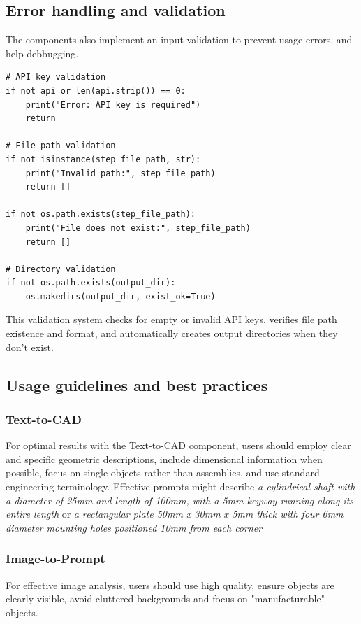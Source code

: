 \subsection{Error handling and validation}

The components also implement an input validation to prevent usage errors, and help debbugging.

\begin{verbatim}
# API key validation
if not api or len(api.strip()) == 0:
    print("Error: API key is required")
    return

# File path validation
if not isinstance(step_file_path, str):
    print("Invalid path:", step_file_path)
    return []

if not os.path.exists(step_file_path):
    print("File does not exist:", step_file_path)
    return []

# Directory validation
if not os.path.exists(output_dir):
    os.makedirs(output_dir, exist_ok=True)
\end{verbatim}

This validation system checks for empty or invalid API keys, verifies file path existence and format, and automatically creates output directories when they don't exist.

\subsection{Usage guidelines and best practices}

\subsubsection{Text-to-CAD}

For optimal results with the Text-to-CAD component, users should employ clear and specific geometric descriptions, include dimensional information when possible, focus on single objects rather than assemblies, and use standard engineering terminology. Effective prompts might describe \textit{a cylindrical shaft with a diameter of 25mm and length of 100mm, with a 5mm keyway running along its entire length} or \textit{a rectangular plate 50mm x 30mm x 5mm thick with four 6mm diameter mounting holes positioned 10mm from each corner}

\subsubsection{Image-to-Prompt}

For effective image analysis, users should use high quality, ensure objects are clearly visible, avoid cluttered backgrounds and focus on "manufacturable" objects.

